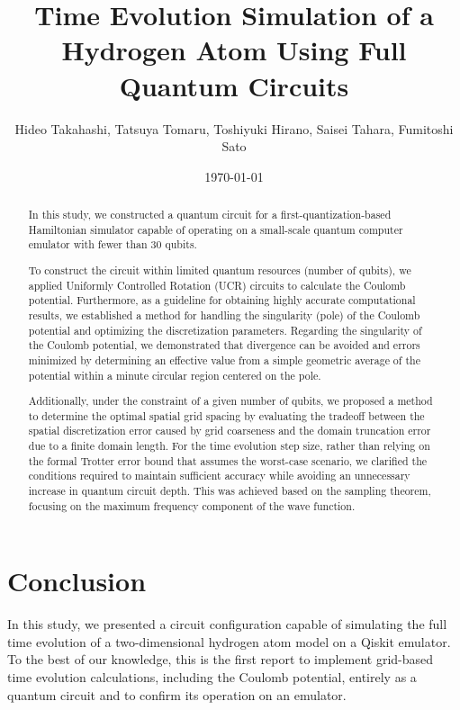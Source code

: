 \documentclass[fontsize=11pt]{article} %
\begin{document}
\title
{Time Evolution Simulation of a Hydrogen Atom Using Full Quantum Circuits}

\author{Hideo Takahashi, Tatsuya Tomaru, Toshiyuki Hirano, Saisei Tahara, Fumitoshi Sato}
\date{\today}
\maketitle

\begin{abstract}
In this study, we constructed a quantum circuit for a first-quantization-based
Hamiltonian simulator capable of operating on a small-scale quantum computer
emulator with fewer than 30 qubits.

To construct the circuit within limited quantum resources (number of qubits), we
applied Uniformly Controlled Rotation (UCR) circuits to calculate the Coulomb
potential. Furthermore, as a guideline for obtaining highly accurate
computational results, we established a method for handling the singularity
(pole) of the Coulomb potential and optimizing the discretization parameters.
Regarding the singularity of the Coulomb potential, we demonstrated that
divergence can be avoided and errors minimized by determining an effective value
from a simple geometric average of the potential within a minute circular region
centered on the pole.

Additionally, under the constraint of a given number of qubits, we proposed a
method to determine the optimal spatial grid spacing by evaluating the tradeoff
between the spatial discretization error caused by grid coarseness and the
domain truncation error due to a finite domain length. For the time evolution
step size, rather than relying on the formal Trotter error bound that assumes
the worst-case scenario, we clarified the conditions required to maintain
sufficient accuracy while avoiding an unnecessary increase in quantum circuit
depth. This was achieved based on the sampling theorem, focusing on the maximum
frequency component of the wave function.
\end{abstract}






\section{Conclusion}
In this study, we presented a circuit configuration capable of simulating the
full time evolution of a two-dimensional hydrogen atom model on a Qiskit
emulator. To the best of our knowledge, this is the first report to implement
grid-based time evolution calculations, including the Coulomb potential,
entirely as a quantum circuit and to confirm its operation on an emulator.
\end{document}
